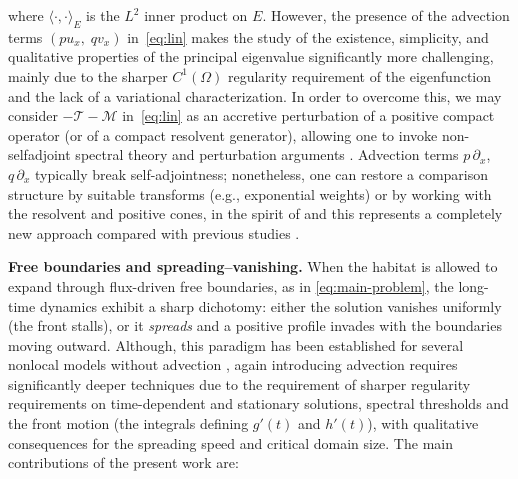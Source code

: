 \documentclass[a4paper,11pt]{amsart}
\theoremstyle{definition}
\numberwithin{equation}{section}
\theoremstyle{definition}
\begin{document}
where $\langle\cdot,\cdot\rangle_E$ is the $L^2$ inner product on $E$. However, the presence of the advection terms $(p u_x,\; q v_x)$ in~\eqref{eq:lin}
makes the study of the existence, simplicity, and qualitative properties of the
principal eigenvalue significantly more challenging, mainly due to the sharper
$C^1(\Omega)$ regularity requirement of the eigenfunction and the lack of a
variational characterization. In order to overcome this, we may consider $-\mathcal{T}-\mathcal{M}$ in~\eqref{eq:lin} as an accretive perturbation of a positive compact operator (or of a compact resolvent generator), allowing one to invoke non-selfadjoint spectral theory and perturbation arguments \cite{Kato1995}. Advection terms $p\,\partial_x$, $q\,\partial_x$ typically break self-adjointness; nonetheless, one can restore a comparison structure by suitable transforms (e.g., exponential weights) or by working with the resolvent and positive cones, in the spirit of \cite{KreinRutman1948,Burger1988,Kato1995} and this represents a completely new approach compared with previous studies \cite{Berestycki2016a,Du,Tang2024a, Tang2024b, ThuVo2025, NguyenVo2022, DuNi2020, Cao2019, Bao2017, Ahn2016}.










\medskip
\noindent\textbf{Free boundaries and spreading--vanishing.}
When the habitat is allowed to expand through flux-driven free boundaries, as in \eqref{eq:main-problem}, the long-time dynamics exhibit a sharp dichotomy: either the solution vanishes uniformly (the front stalls), or it \emph{spreads} and a positive profile invades with the boundaries moving outward. Although, this paradigm has been established for several nonlocal models without advection \cite{Tang2024b, NguyenVo2022, DuNi2020, Cao2019, Du,Zhao2020}, again introducing advection requires significantly deeper techniques due to the requirement of sharper regularity requirements on time-dependent and stationary solutions, spectral thresholds and the front motion (the integrals defining $g'(t)$ and $h'(t)$), with qualitative consequences for the spreading speed and critical domain size. The main contributions of the present work are:
\end{document}
